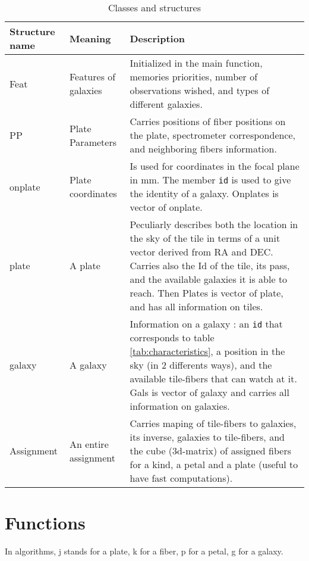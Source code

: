 \documentclass{article}
\begin{document}
\begin{table}\begin{center}
	\caption{Classes and structures}\label{tab:structures}
	\begin{tabular}{|l|l|p{12cm}|}\\ \hline
		Structure name & Meaning & Description \\ \hline\hline

		Feat & Features of galaxies & Initialized in the main function, memories priorities, number of observations wished, and types of different galaxies.\\ \hline

		PP & Plate Parameters & Carries positions of fiber positions on the plate, spectrometer correspondence, and neighboring fibers information.\\ 

		onplate & Plate coordinates & Is used for coordinates in the focal plane in mm. The member {\tt id} is used to give the identity of a galaxy. Onplates is vector of onplate.\\ 

		plate & A plate & Peculiarly describes both the location in the sky of the tile in terms of a unit vector derived from RA and DEC. Carries also the Id of the tile, its pass, and the available galaxies it is able to reach. Then Plates is vector of plate, and has all information on tiles.\\ \hline

		galaxy & A galaxy & Information on a galaxy : an {\tt id} that corresponds to table \ref{tab:characteristics}, a position in the sky (in 2 differents ways), and the available tile-fibers that can watch at it. Gals is vector of galaxy and carries all information on galaxies.\\ \hline

		Assignment & An entire assignment & Carries maping of tile-fibers to galaxies, its inverse, galaxies to tile-fibers, and the cube (3d-matrix) of assigned fibers for a kind, a petal and a plate (useful to have fast computations).\\ \hline
	\end{tabular}\end{center}
\end{table}

\section{Functions}
In algorithms, j stands for a plate, k for a fiber, p for a petal, g for a galaxy.
\end{document}
